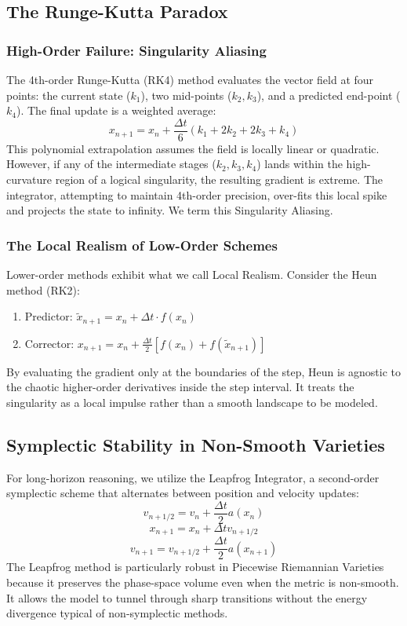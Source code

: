 \documentclass{article}
\numberwithin{equation}{section}
\begin{document}
\subsection{The Runge-Kutta Paradox}
\subsubsection{High-Order Failure: Singularity Aliasing}
The 4th-order Runge-Kutta (RK4) method evaluates the vector field at four points: the current state ($k_1$), two mid-points ($k_2, k_3$), and a predicted end-point ($k_4$). The final update is a weighted average:
\[
x_{n+1} = x_n + \frac{\Delta t}{6}(k_1 + 2k_2 + 2k_3 + k_4)
\]
This polynomial extrapolation assumes the field is locally linear or quadratic. However, if any of the intermediate stages ($k_2, k_3, k_4$) lands within the high-curvature region of a logical singularity, the resulting gradient is extreme. The integrator, attempting to maintain 4th-order precision, over-fits this local spike and projects the state to infinity. We term this Singularity Aliasing.

\subsubsection{The Local Realism of Low-Order Schemes}
Lower-order methods exhibit what we call Local Realism. Consider the Heun method (RK2):
\begin{enumerate}
\item Predictor: $\tilde{x}_{n+1} = x_n + \Delta t \cdot f(x_n)$
\item Corrector: $x_{n+1} = x_n + \frac{\Delta t}{2}[f(x_n) + f(\tilde{x}_{n+1})]$
\end{enumerate}
By evaluating the gradient only at the boundaries of the step, Heun is agnostic to the chaotic higher-order derivatives inside the step interval. It treats the singularity as a local impulse rather than a smooth landscape to be modeled.

\subsection{Symplectic Stability in Non-Smooth Varieties}
For long-horizon reasoning, we utilize the Leapfrog Integrator, a second-order symplectic scheme that alternates between position and velocity updates:
\[
v_{n+1/2} = v_n + \frac{\Delta t}{2} a(x_n)
\]
\[
x_{n+1} = x_n + \Delta t v_{n+1/2}
\]
\[
v_{n+1} = v_{n+1/2} + \frac{\Delta t}{2} a(x_{n+1})
\]
The Leapfrog method is particularly robust in Piecewise Riemannian Varieties because it preserves the phase-space volume even when the metric is non-smooth. It allows the model to tunnel through sharp transitions without the energy divergence typical of non-symplectic methods.
\end{document}
